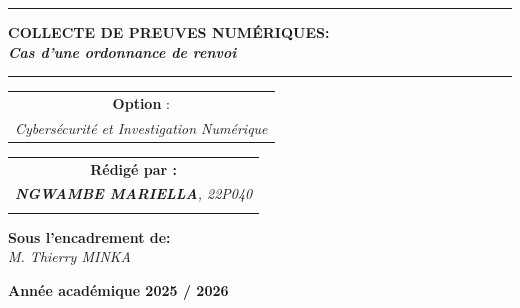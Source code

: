 \documentclass[memoire, 12pt]{report}
\begin{document}
\begin{titlepage}
\begin{center}
		\vspace{0.5cm}
		\begin{tabular}{l*{40}{@{\hskip 3.5cm}c@{\hskip5cm}} p{3.5cm} r}
		\end{tabular}
		
		\noindent\rule{\textwidth}{0.7mm}
		\Large{{\textbf{COLLECTE DE PREUVES NUMÉRIQUES:}}}\\
		\Large{{\textbf{\textit{Cas d'une ordonnance de renvoi}}}}
		\noindent\rule{\textwidth}{0.7mm}
	\end{center}
		
	\begin{center}
	\begin{tabular}{c}
		
		\vspace{0.1cm}
		\normalsize
	
	
		\vspace{0.1cm}
		\normalsize\textbf{Option }:\\			
		\textsl{Cybersécurité et Investigation Numérique}
		
	\end{tabular}
	\end{center}
		
	\begin{center}
		\normalsize %
		\begin{tabular}{c}
			\vspace{0.07cm}
			\hspace{0.02cm} \textbf{\textbf{Rédigé par :}}\\
			\hspace{0.02cm} \textsl{\textbf{NGWAMBE  MARIELLA}, 22P040}\\\\
			
		\end{tabular}
	\end{center}
	
	\begin{center}
	\hspace{0.02cm} \textbf{Sous l'encadrement de:}\\
	\hspace{0.02cm} \textsl{M. Thierry MINKA}
	\end{center}
	
    
	\vspace{2cm}
	\begin{center}
		\textbf{Année académique 2025 / 2026}
	\end{center}
		
	\vspace{-1.4cm}
	
		
	\vfill%
	
\end{titlepage}
\tableofcontents
\newpage
\end{document}
